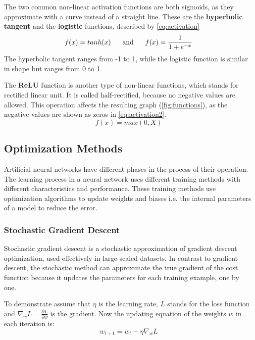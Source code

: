 \bigskip \noindent The two common non-linear activation functions are both sigmoids, as they approximate with a curve instead of a straight line. These are the \textbf{hyperbolic tangent} and the \textbf{logistic} functions, described by \autoref{eq:activation}
\begin{equation} f(x)=tanh(x) ~~~~~ \hbox{and} ~~~~~ f(x)=\frac{1}{1+e^{-x}} \label{eq:activation} \end{equation}
The hyperbolic tangent ranges from -1 to 1, while the logistic function is similar in shape but ranges from 0 to 1. \medskip

The \textbf{ReLU} function is another type of non-linear functions, which stands for rectified linear unit. It is called half-rectified, because no negative values are allowed. This operation affects the resulting graph (\autoref{fig:functions}), as the negative values are shown as zeros in \autoref{eq:activation2}.
\begin{equation} f(x) = max(0,X) \label{eq:activation2} \end{equation}



\subsection{Optimization Methods}

Artificial neural networks have different phases in the process of their operation. The learning process in a neural network uses different training methods with different characteristics and performance. These training methods use optimization algorithms to update weights and biases i.e. the internal parameters of a model to reduce the error. \cite{veerarajan2007numerical, sathasivam2003optimization}



\subsubsection{Stochastic Gradient Descent}

Stochastic gradient descent is a stochastic approximation of gradient descent optimization, used effectively in large-scaled datasets. In contrast to gradient descent, the stochastic method can approximate the true gradient of the cost function because it updates the parameters for each training example, one by one. \smallskip

To demonstrate assume that $\eta$ is the learning rate, $L$ stands for the loss function and $\nabla_w L = \frac{\partial L}{\partial w}$ is the gradient. Now the updating equation of the weights $w$ in each iteration is:
\begin{equation} w_{t+1} = w_t - \eta \nabla_w L \label{eq:sgd} \end{equation} 

